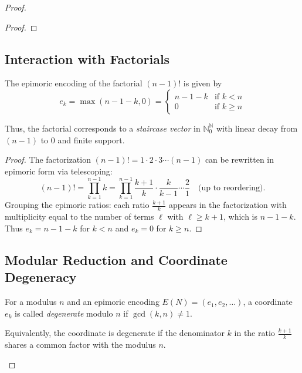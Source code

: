 \begin{proof}
\begin{proof}
\end{proof}

\subsection{Interaction with Factorials}
\label{subsec:factorial-encoding}

\begin{lemma}
\label{lem:factorial-encoding}
The epimoric encoding of the factorial $(n-1)!$ is given by
\begin{equation}
\label{eq:factorial-epimoric}
e_k = \max(n - 1 - k, 0) = \begin{cases} n - 1 - k & \text{if } k < n \\ 0 & \text{if } k \geq n \end{cases}
\end{equation}

Thus, the factorial corresponds to a \emph{staircase vector} in $\mathbb{N}_0^\mathbb{N}$ with linear decay from $(n-1)$ to $0$ and finite support.
\end{lemma}

\begin{proof}
The factorization $(n-1)! = 1 \cdot 2 \cdot 3 \cdots (n-1)$ can be rewritten in epimoric form via telescoping:
\[
(n-1)! = \prod_{k=1}^{n-1} k = \prod_{k=1}^{n-1} \frac{k+1}{k} \cdot \frac{k}{k-1} \cdots \frac{2}{1} \quad \text{(up to reordering)}.
\]
Grouping the epimoric ratios: each ratio $\frac{k+1}{k}$ appears in the factorization with multiplicity equal to the number of terms $\ell$ with $\ell \geq k+1$, which is $n - 1 - k$. Thus $e_k = n - 1 - k$ for $k < n$ and $e_k = 0$ for $k \geq n$.
\end{proof}

\subsection{Modular Reduction and Coordinate Degeneracy}
\label{subsec:coordinate-degeneracy}

\begin{definition}
\label{def:degeneracy}
For a modulus $n$ and an epimoric encoding $E(N) = (e_1, e_2, \ldots)$, a coordinate $e_k$ is called \emph{degenerate} modulo $n$ if $\gcd(k, n) \neq 1$.

Equivalently, the coordinate is degenerate if the denominator $k$ in the ratio $\frac{k+1}{k}$ shares a common factor with the modulus $n$.
\end{definition}


\end{proof}

